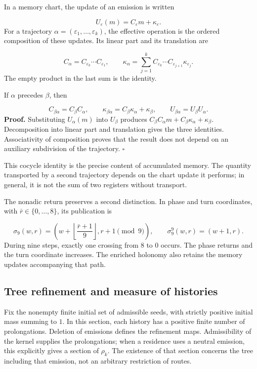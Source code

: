 In a memory chart, the update of an emission is written

\[
U_\varepsilon(m)=C_\varepsilon m+\kappa_\varepsilon.
\]
For a trajectory \(\alpha=(\varepsilon_1,\ldots,\varepsilon_k)\), the effective operation is the ordered composition of these updates. Its linear part and its translation are

\[
C_\alpha=C_{\varepsilon_k}\cdots C_{\varepsilon_1},
\qquad
\kappa_\alpha=
\sum_{j=1}^{k}C_{\varepsilon_k}\cdots
C_{\varepsilon_{j+1}}\kappa_{\varepsilon_j}.
\]
The empty product in the last sum is the identity.

If \(\alpha\) precedes \(\beta\), then

\[
C_{\beta\alpha}=C_\beta C_\alpha,
\qquad
\kappa_{\beta\alpha}=C_\beta\kappa_\alpha+\kappa_\beta,
\qquad
U_{\beta\alpha}=U_\beta U_\alpha.
\]
\textbf{Proof.} Substituting \(U_\alpha(m)\) into \(U_\beta\) produces \(C_\beta C_\alpha m+C_\beta\kappa_\alpha+\kappa_\beta\). Decomposition into linear part and translation gives the three identities. Associativity of composition proves that the result does not depend on an auxiliary subdivision of the trajectory. \hfill\(\square\)

This cocycle identity is the precise content of accumulated memory. The quantity transported by a second trajectory depends on the chart update it performs; in general, it is not the sum of two registers without transport.

The nonadic return preserves a second distinction. In phase and turn coordinates, with \(\bar r\in\{0,\ldots,8\}\), its publication is

\[
\sigma_9(w,r)=
\left(w+\left\lfloor\frac{\bar r+1}{9}\right\rfloor,
r+1\pmod9\right),
\qquad
\sigma_9^9(w,r)=(w+1,r).
\]
During nine steps, exactly one crossing from \(8\) to \(0\) occurs. The phase returns and the turn coordinate increases. The enriched holonomy also retains the memory updates accompanying that path.

\subsection{Tree refinement and measure of histories}
Fix the nonempty finite initial set of admissible seeds, with strictly positive initial mass summing to \(1\). In this section, each history has a positive finite number of prolongations. Deletion of emissions defines the refinement maps. Admissibility of the kernel supplies the prolongations; when a residence uses a neutral emission, this explicitly gives a section of \(\rho_k\). The existence of that section concerns the tree including that emission, not an arbitrary restriction of routes.

